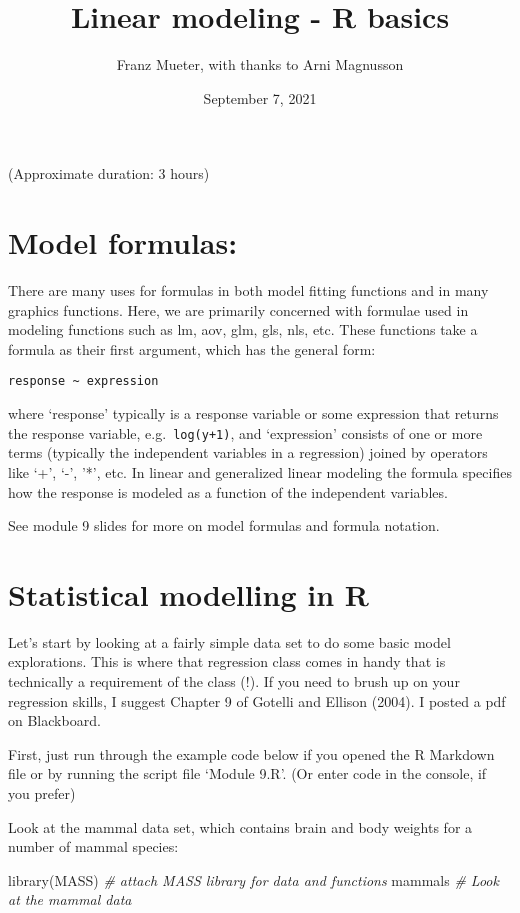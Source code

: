 \documentclass[
]{article}
\title{Linear modeling - R basics}
\author{Franz Mueter, with thanks to Arni Magnusson}
\date{September 7, 2021}
\newenvironment{Shaded}{\begin{snugshade}}{\end{snugshade}}
\newcommand{\CommentTok}[1]{\textcolor[rgb]{0.56,0.35,0.01}{\textit{#1}}}
\newcommand{\FunctionTok}[1]{\textcolor[rgb]{0.00,0.00,0.00}{#1}}
\newcommand{\NormalTok}[1]{#1}
\begin{document}
\maketitle

(Approximate duration: 3 hours)

\hypertarget{model-formulas}{%
\section{Model formulas:}\label{model-formulas}}

There are many uses for formulas in both model fitting functions and in
many graphics functions. Here, we are primarily concerned with formulae
used in modeling functions such as lm, aov, glm, gls, nls, etc. These
functions take a formula as their first argument, which has the general
form:

\texttt{response\ \textasciitilde{}\ expression}

where `response' typically is a response variable or some expression
that returns the response variable, e.g.~\texttt{log(y+1)}, and
`expression' consists of one or more terms (typically the independent
variables in a regression) joined by operators like `+', `-', '*', etc.
In linear and generalized linear modeling the formula specifies how the
response is modeled as a function of the independent variables.

See module 9 slides for more on model formulas and formula notation.

\hypertarget{statistical-modelling-in-r}{%
\section{Statistical modelling in R}\label{statistical-modelling-in-r}}

Let's start by looking at a fairly simple data set to do some basic
model explorations. This is where that regression class comes in handy
that is technically a requirement of the class (!). If you need to brush
up on your regression skills, I suggest Chapter 9 of Gotelli and Ellison
(2004). I posted a pdf on Blackboard.

First, just run through the example code below if you opened the R
Markdown file or by running the script file `Module 9.R'. (Or enter code
in the console, if you prefer)

Look at the mammal data set, which contains brain and body weights for a
number of mammal species:

\begin{Shaded}
\begin{Highlighting}[]
\FunctionTok{library}\NormalTok{(MASS)           }\CommentTok{\# attach MASS library for data and functions}
\NormalTok{mammals           }\CommentTok{\# Look at the mammal data}
\end{Highlighting}
\end{Shaded}
\end{document}
